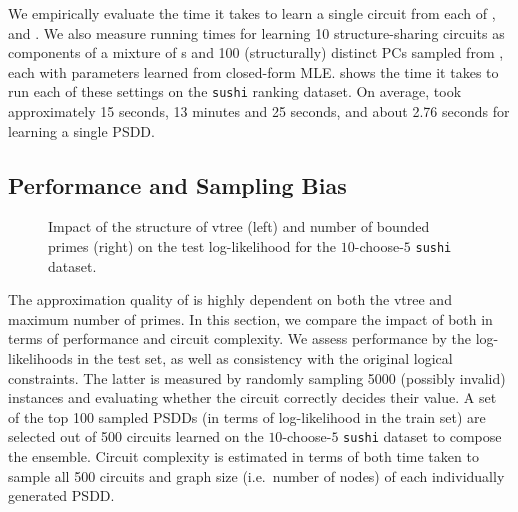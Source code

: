 We empirically evaluate the time it takes to learn a single circuit from each of
,  and . We also measure running times
for learning 10 structure-sharing circuits as components of a mixture of s and
100 (structurally) distinct PCs sampled from , each with parameters learned
from closed-form MLE.  shows the time it takes to run each of these settings
on the \texttt{sushi} ranking dataset. On average,  took approximately \num{15}
seconds,  \num{13} minutes and \num{25} seconds, and 
about \num{2.76} seconds for learning a single PSDD.

\subsection{Performance and Sampling Bias}
\label{sec:samplebias}

\begin{figure}[t]
  \begin{subfigure}{0.495\textwidth}
    \caption{}
  \end{subfigure}
  \begin{subfigure}{0.495\textwidth}
    \resizebox{\textwidth}{!}{\texttt{[image: k\_ll]}}
    \caption{}
  \end{subfigure}
  \caption{Impact of the structure of vtree (left) and number of bounded primes (right) on the
    test log-likelihood for the $10$-choose-$5$ \texttt{sushi} dataset.}
  \label{fig:ll-comp}
\end{figure}

The approximation quality of  is highly dependent on both the vtree and
maximum number of primes. In this section, we compare the impact of both in terms of performance
and circuit complexity. We assess performance by the log-likelihoods in the test set, as well as
consistency with the original logical constraints. The latter is measured by randomly sampling
\num{5000} (possibly invalid) instances and evaluating whether the circuit correctly decides their
value. A set of the top \num{100} sampled PSDDs (in terms of log-likelihood in the train set) are
selected out of \num{500} circuits learned on the $10$-choose-$5$ \texttt{sushi} dataset to compose
the ensemble. Circuit complexity is estimated in terms of both time taken to sample all 500
circuits and graph size (i.e.\ number of nodes) of each individually generated PSDD.

